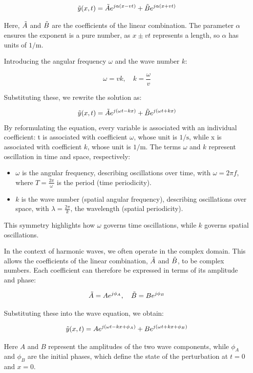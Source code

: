 \documentclass[a4paper]{article}
\begin{document}
\[
\Tilde{y}(x, t) = \Tilde{A} e^{j\alpha (x - vt)} + \Tilde{B} e^{j\alpha (x + vt)}
\]

Here, \(\Tilde{A}\) and \(\Tilde{B}\) are the coefficients of the linear combination. The parameter \(\alpha\) ensures the exponent is a pure number, as \(x \pm vt\) represents a length, so \(\alpha\) has units of \(1/\mathrm{m}\).

Introducing the angular frequency \(\omega\) and the wave number \(k\):

\[
\omega = vk, \quad k = \frac{\omega}{v}
\]

Substituting these, we rewrite the solution as:

\[
\Tilde{y}(x, t) = \Tilde{A} e^{j(\omega t - kx)} + \Tilde{B} e^{j(\omega t + kx)}
\]
By reformulating the equation, every variable is associated with an individual coefficient: t is associated with coefficient \(\omega\), whose unit is \(1/\mathrm{s}\), while x is associated with coefficient \(k\), whose unit is \(1/\mathrm{m}\).
The terms \(\omega\) and \(k\) represent oscillation in time and space, respectively:
\begin{itemize}
    \item \(\omega\) is the angular frequency, describing oscillations over time, with \(\omega = 2\pi f\), where \(T = \frac{2\pi}{\omega}\) is the period (time periodicity).
\item \(k\) is the wave number (spatial angular frequency), describing oscillations over space, with \(\lambda = \frac{2\pi}{k}\), the wavelength (spatial periodicity).
\end{itemize}

This symmetry highlights how \(\omega\) governs time oscillations, while \(k\) governs spatial oscillations.

In the context of harmonic waves, we often operate in the complex domain. This allows the coefficients of the linear combination, \(\Tilde{A}\) and \(\Tilde{B}\), to be complex numbers. Each coefficient can therefore be expressed in terms of its amplitude and phase:

\[
\Tilde{A} = A e^{j\phi_A}, \quad \Tilde{B} = B e^{j\phi_B}
\]

Substituting these into the wave equation, we obtain:

\[
\Tilde{y}(x, t) = A e^{j(\omega t - kx + \phi_A)} + B e^{j(\omega t + kx + \phi_B)}
\]

Here \(A\) and \(B\) represent the amplitudes of the two wave components, while \(\phi_A\) and \(\phi_B\) are the initial phases, which define the state of the perturbation at \(t = 0\) and \(x = 0\).
\end{document}

